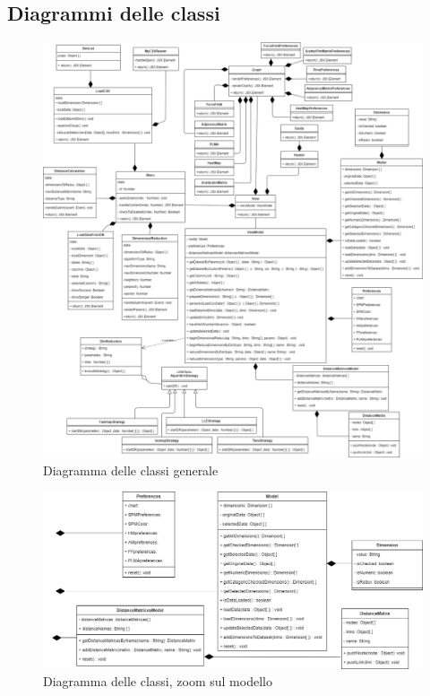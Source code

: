 \subsection{Diagrammi delle classi}
\begin{figure}[hb]
\includegraphics[width=14.8cm]{Images/Allegato Tecnico-Class}
\centering
\caption{Diagramma delle classi generale}
\end{figure}

\begin{landscape}
\vspace*{\fill}
\begin{figure}[hb]
\includegraphics[width=\linewidth]{Images/Allegato Tecnico-Model}
\centering
\caption{Diagramma delle classi, zoom sul modello}
\end{figure}
\vfill
\end{landscape}

